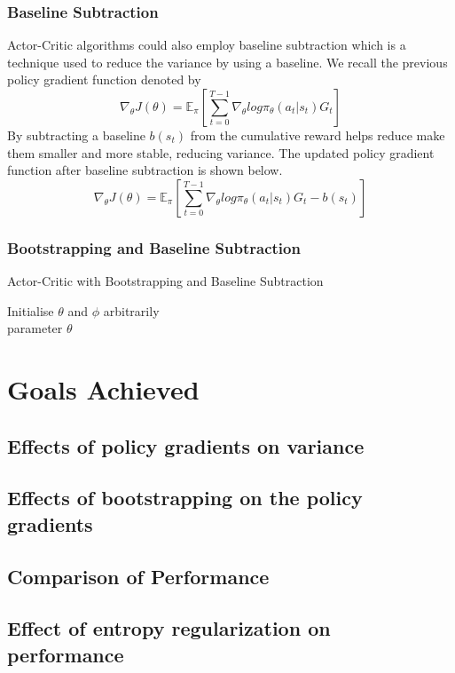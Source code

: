 \documentclass{article}
\begin{document}
\subsubsection{Baseline Subtraction}
Actor-Critic algorithms could also employ baseline subtraction which is a technique used to reduce the variance by using a baseline. We recall the previous policy gradient function denoted by 
\begin{equation*}
\nabla_\theta J(\theta) = \mathbb{E}_\pi[\sum _{t=0}^{T-1} \nabla_\theta log\pi_\theta (a_t|s_t)G_t]
\end{equation*}
By subtracting a baseline $b(s_t)$ from the cumulative reward helps reduce make them smaller and more stable, reducing variance. The updated policy gradient function after baseline subtraction is shown below. 
\begin{equation*}
\nabla_\theta J(\theta) = \mathbb{E}_\pi[\sum _{t=0}^{T-1} \nabla_\theta log\pi_\theta (a_t|s_t)G_t - b(s_t)]
\end{equation*}


\subsubsection{Bootstrapping and Baseline Subtraction}

\begin{algorithm}[htbp]
\caption{Actor-Critic with Bootstrapping and Baseline Subtraction}
\SetAlgoLined
\DontPrintSemicolon
\small %
Initialise $\theta$ and $\phi$ arbitrarily\;\\
\RETURN parameter $\theta$\;
\end{algorithm}

\section{Goals Achieved}
\subsection{Effects of policy gradients on variance}
\subsection{Effects of bootstrapping on the policy gradients}
\subsection{Comparison of Performance}
\subsection{Effect of entropy regularization on performance}



\end{document}
